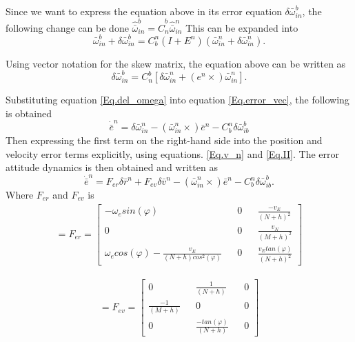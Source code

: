 Since we want to express the equation above in its error equation $\delta \bar{\omega}_{in}^b$, the following change can be done $\hat{\bar{\omega}}_{in}^b = \hat{C}_n^b\hat{\bar{\omega}}_{in}^n$ This can be expanded into
\begin{equation}
\bar{\omega}_{in}^b + \delta \bar{\omega}_{in}^b = C_b^n(I+E^n)(\bar{\omega}_{in}^n+\delta\bar{\omega}_{in}^n).
\end{equation}

\noindent Using vector notation for the skew matrix, the equation above can be written as
\begin{equation}
\delta\bar{\omega}_{in}^b = C_n^b [\delta\bar{\omega}_{in}^n + (e^n\times)\bar{\omega}_{in}^n].
\label{Eq.del_omega}
\end{equation}

\noindent Substituting equation \eqref{Eq.del_omega} into equation \eqref{Eq.error_vec}, the following is obtained
\begin{equation}
\dot{\bar{e}}^n = \delta\bar{\omega}_{in}^n -(\bar{\omega}_{in}^n \times )\bar{e}^n - C_b^n\delta \bar{\omega}_{ib}^b 
\label{Eq.err_final}
\end{equation}
Then expressing the first term on the right-hand side into the position and velocity error terms explicitly, using equations. \eqref{Eq.v_n} and \eqref{Eq.II}. The error attitude dynamics is then obtained and written as
\begin{equation}
\dot{\bar{e}}^n = F_{er}\delta \bar{r}^n + F_{ev}\delta \bar{v}^n - (\bar{\omega}_{in}^n \times)\bar{e}^n - C_b^n\delta\bar{\omega}_{ib}^b.
\end{equation}
Where $F_{er}$ and $F_{ev}$ is	
\begin{align} = 
F_{er} =
\begin{bmatrix}
-\omega_e sin(\varphi) && 0 && \frac{-v_E}{(N+h)^2}\\
0 && 0 && \frac{v_N}{(M+h)^2} \\
\omega_e cos(\varphi) - \frac{v_E}{(N+h)cos^2(\varphi)} && 0 && \frac{v_E tan(\varphi)}{(N+h)^2}
\end{bmatrix}
\label{Eq.Fer}
\end{align}

\begin{align} = 
F_{ev} =
\begin{bmatrix}
0 && \frac{1}{(N+h)} && 0\\
\frac{-1}{(M+h)} && 0 && 0\\
0 && \frac{-tan(\varphi)}{(N+h)} && 0
\end{bmatrix}
\label{Eq.Fev}
\end{align}

